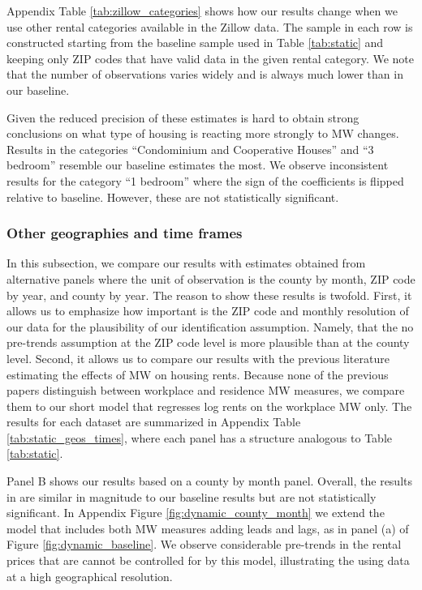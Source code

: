 Appendix Table \ref{tab:zillow_categories} shows how our results change when we 
use other rental categories available in the Zillow data.
The sample in each row is constructed starting from the baseline sample used in 
Table \ref{tab:static} and keeping only ZIP codes that have valid data in the 
given rental category.
We note that the number of observations varies widely and is always much lower
than in our baseline.

Given the reduced precision of these estimates is hard to obtain strong 
conclusions on what type of housing is reacting more strongly to MW changes.
Results in the categories ``Condominium and Cooperative Houses'' and 
``3 bedroom'' resemble our baseline estimates the most.
We observe inconsistent results for the category ``1 bedroom'' where the sign 
of the coefficients is flipped relative to baseline.
However, these are not statistically significant.

\subsubsection*{Other geographies and time frames}

In this subsection, we compare our results with estimates obtained from 
alternative panels where the unit of observation is the county by month, 
ZIP code by year, and county by year.
The reason to show these results is twofold.
First, it allows us to emphasize how important is the ZIP code and monthly 
resolution of our data for the plausibility of our identification assumption.
Namely, that the no pre-trends assumption at the ZIP code level is more 
plausible than at the county level.
Second, it allows us to compare our results with the previous literature 
estimating the effects of MW on housing rents.
Because none of the previous papers distinguish between workplace and residence
MW measures, we compare them to our short model that regresses log rents on
the workplace MW only.
The results for each dataset are summarized in Appendix Table 
\ref{tab:static_geos_times}, where each panel has a structure analogous
to Table \ref{tab:static}.

Panel B shows our results based on a county by month panel.
Overall, the results in are similar in magnitude to our baseline results 
but are not statistically significant.
In Appendix Figure \ref{fig:dynamic_county_month} we extend the model
that includes both MW measures adding leads and lags, as in panel (a) of Figure 
\ref{fig:dynamic_baseline}.
We observe considerable pre-trends in the rental prices that are cannot be 
controlled for by this model, illustrating the using data at a high 
geographical resolution.


